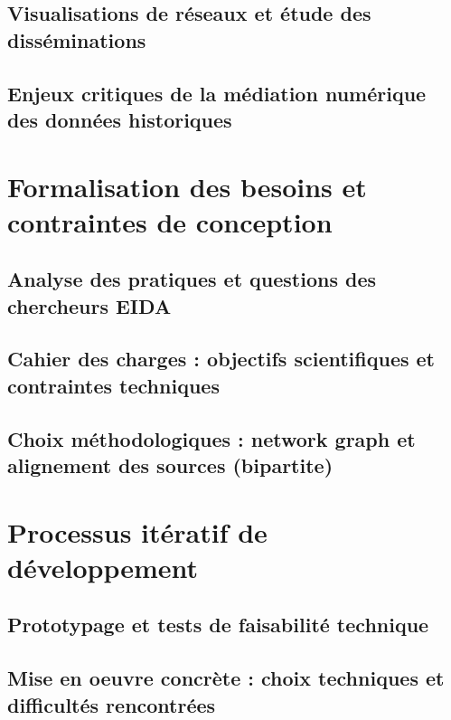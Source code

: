 \documentclass[a4paper,12pt,twoside]{book}
\newcommand{\clearemptydoublepage}{\newpage{\pagestyle{empty}\cleardoublepage}}
\begin{document}
	\section{Visualisations de réseaux et étude des disséminations}
	
	
	\section{Enjeux critiques de la médiation numérique des données historiques}
	
	
	\clearemptydoublepage
	
	\chapter{Formalisation des besoins et contraintes de conception}
	\section{Analyse des pratiques et questions des chercheurs EIDA}
	
	
	\section{Cahier des charges : objectifs scientifiques et contraintes techniques}
	
	
	\section{Choix méthodologiques : network graph et alignement des sources (bipartite)}
	
	
	\clearemptydoublepage
	
	\chapter{Processus itératif de développement}
	\section{Prototypage et tests de faisabilité technique}
	
	
	\section{Mise en oeuvre concrète : choix techniques et difficultés rencontrées}
	
	
\end{document}
